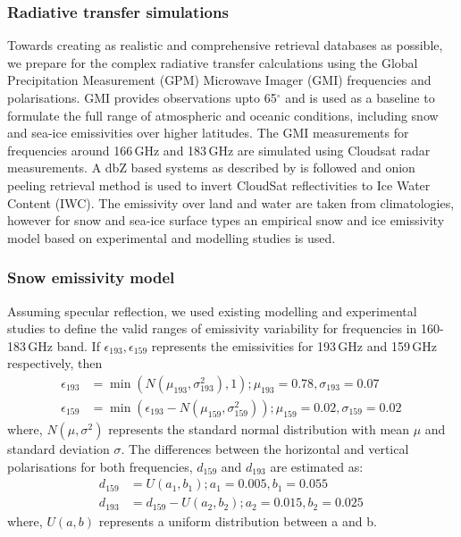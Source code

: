 \documentclass[12pt,oneside,a4paper]{article}
\begin{document}
\subsubsection{Radiative transfer simulations}
%
\label{sec:radiative_transfer}
Towards creating as realistic and comprehensive retrieval databases as possible, we prepare for the complex radiative transfer calculations using the Global Precipitation Measurement (GPM) Microwave Imager (GMI) frequencies and polarisations. GMI provides observations upto 65$^{\circ}$ and is used as a baseline to formulate the full range of atmospheric and oceanic conditions, including snow and sea-ice emissivities over higher latitudes. The GMI measurements for frequencies around 166\,GHz and 183\,GHz are simulated using Cloudsat radar measurements. A dbZ based systems as described by \citet{ekelund:using:20} is followed and onion peeling retrieval method is used to invert CloudSat reflectivities to Ice Water Content (IWC). The emissivity over land and water are taken from climatologies, however for snow and sea-ice surface types an empirical snow and ice emissivity model based on experimental and modelling studies is used.
\subsubsection*{Snow emissivity model}
%
Assuming specular reflection, we used existing modelling and experimental studies\citep{harlow:2009:milli, harlow:2012:tundr,hewison:2002:airbo} to define the valid ranges of emissivity variability for frequencies in 160-183\,GHz band. If $\epsilon_{193}, \epsilon_{159}$ represents the emissivities for 193\,GHz and 159\,GHz respectively, then
\begin{align}
\epsilon_{193}& = \min({N(\mu_{193}, \sigma_{193}^{2}), 1}) ; \mu_{193} = 0.78, \sigma_{193} = 0.07 \\
\epsilon_{159}& = \min(\epsilon_{193} - N(\mu_{159}, \sigma_{159}^{2})) ;  \mu_{159} = 0.02, \sigma_{159} = 0.02\,
\end{align}
where, $N(\mu, \sigma^{2})$ represents the standard normal distribution with mean $\mu$ and standard deviation $\sigma$. The differences between the horizontal and vertical polarisations for both frequencies, $d_{159}$ and $d_{193}$ are estimated as:
\begin{align}
d_{159}& = U(a_1, b_1) ; a_1 = 0.005, b_1 = 0.055\\
d_{193}& = d_{159} - U(a_2, b_2) ; a_2 = 0.015, b_2 = 0.025 \,
\end{align}
where, $U(a, b)$ represents a uniform distribution between a and b. 
\end{document}
